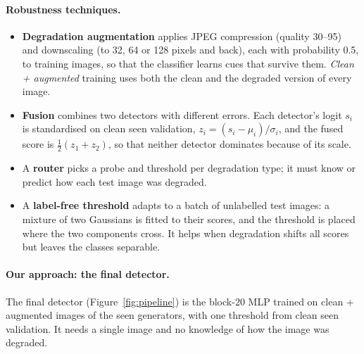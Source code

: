 \documentclass[10pt,a4paper]{article}
\begin{document}
\paragraph{Robustness techniques.}
\begin{itemize}
  \item \textbf{Degradation augmentation} applies JPEG compression (quality 30--95) and downscaling (to 32, 64 or 128 pixels and back), each with probability 0.5, to training images, so that the classifier learns cues that survive them. \emph{Clean + augmented} training uses both the clean and the degraded version of every image.
  \item \textbf{Fusion} combines two detectors with different errors. Each detector's logit $s_i$ is standardised on clean seen validation, $z_i = (s_i - \mu_i)/\sigma_i$, and the fused score is $\tfrac12(z_1 + z_2)$, so that neither detector dominates because of its scale.
  \item A \textbf{router} picks a probe and threshold per degradation type; it must know or predict how each test image was degraded.
  \item A \textbf{label-free threshold} adapts to a batch of unlabelled test images: a mixture of two Gaussians is fitted to their scores, and the threshold is placed where the two components cross. It helps when degradation shifts all scores but leaves the classes separable.
\end{itemize}

\paragraph{Our approach: the final detector.}
The final detector (Figure~\ref{fig:pipeline}) is the block-20 MLP trained on clean + augmented images of the seen generators, with one threshold from clean seen validation. It needs a single image and no knowledge of how the image was degraded.
\end{document}

